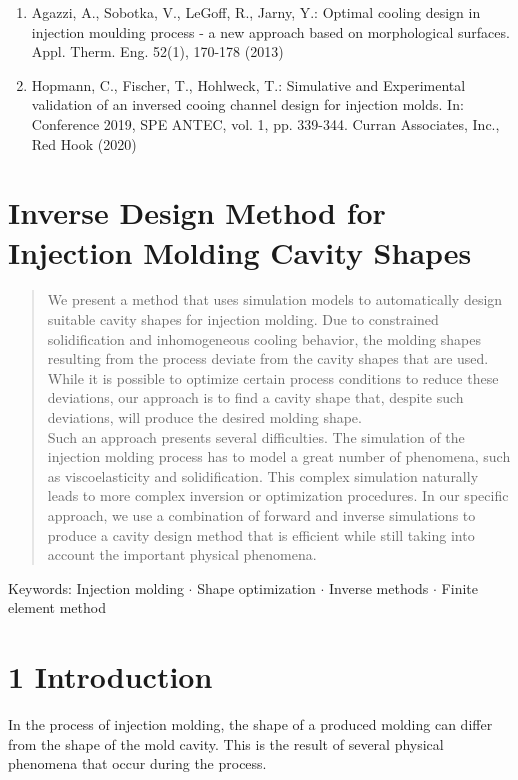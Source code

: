 \documentclass[10pt]{article}
\begin{document}
\begin{enumerate}
  \item Agazzi, A., Sobotka, V., LeGoff, R., Jarny, Y.: Optimal cooling design in injection moulding process - a new approach based on morphological surfaces. Appl. Therm. Eng. 52(1), 170-178 (2013)

  \item Hopmann, C., Fischer, T., Hohlweck, T.: Simulative and Experimental validation of an inversed cooing channel design for injection molds. In: Conference 2019, SPE ANTEC, vol. 1, pp. 339-344. Curran Associates, Inc., Red Hook (2020)

\end{enumerate}

\section*{Inverse Design Method for Injection Molding Cavity Shapes }


\begin{abstract}
We present a method that uses simulation models to automatically design suitable cavity shapes for injection molding. Due to constrained solidification and inhomogeneous cooling behavior, the molding shapes resulting from the process deviate from the cavity shapes that are used. While it is possible to optimize certain process conditions to reduce these deviations, our approach is to find a cavity shape that, despite such deviations, will produce the desired molding shape.\\
Such an approach presents several difficulties. The simulation of the injection molding process has to model a great number of phenomena, such as viscoelasticity and solidification. This complex simulation naturally leads to more complex inversion or optimization procedures. In our specific approach, we use a combination of forward and inverse simulations to produce a cavity design method that is efficient while still taking into account the important physical phenomena.
\end{abstract}

Keywords: Injection molding $\cdot$ Shape optimization $\cdot$ Inverse methods $\cdot$ Finite element method

\section*{1 Introduction}
In the process of injection molding, the shape of a produced molding can differ from the shape of the mold cavity. This is the result of several physical phenomena that occur during the process.
\end{document}
